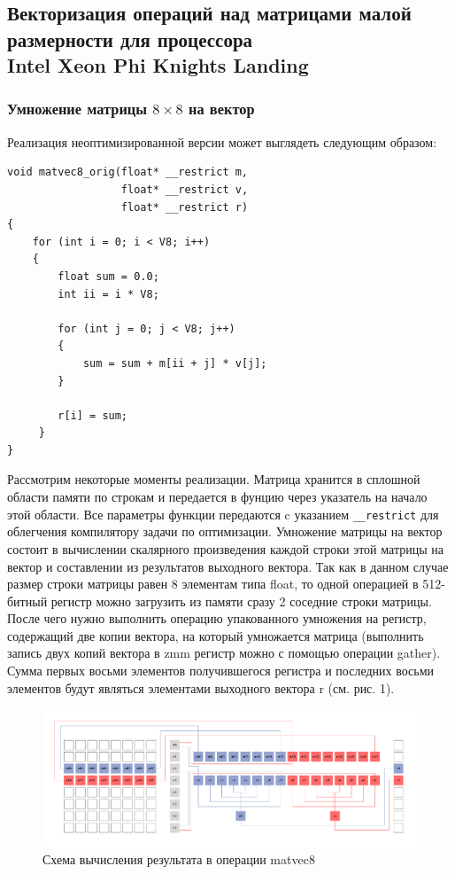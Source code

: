 \subsection{Векторизация операций над матрицами малой размерности для процессора \\ Intel Xeon Phi Knights Landing}

\subsubsection{Умножение матрицы $8 \times 8$ на вектор}

Реализация неоптимизированной версии может выглядеть следующим образом:

\begin{lstlisting}[caption={Невекторизованная версия умножения матрицы размера $8 \times 8$ на вектор},label={lst:text_4_small_matr_8x8_mul_vel_noopt}]
void matvec8_orig(float* __restrict m,
                  float* __restrict v,
                  float* __restrict r)
{
    for (int i = 0; i < V8; i++)
    {
        float sum = 0.0;
        int ii = i * V8;

        for (int j = 0; j < V8; j++)
        {
            sum = sum + m[ii + j] * v[j];
        }

        r[i] = sum;
     }
}
\end{lstlisting}

Рассмотрим некоторые моменты реализации.
Матрица хранится в сплошной области памяти по строкам и передается в фунцию через указатель на начало этой области.
Все параметры функции передаются c указанием \texttt{\_\_restrict} для облегчения компилятору задачи по оптимизации.
Умножение матрицы на вектор состоит в вычислении скалярного произведения каждой строки этой матрицы на вектор и составлении из результатов выходного вектора.
Так как в данном случае размер строки матрицы равен 8 элементам типа float, то одной операцией в 512-битный регистр можно загрузить из памяти сразу 2 соседние строки матрицы.
После чего нужно выполнить операцию упакованного умножения на регистр, содержащий две копии вектора, на который умножается матрица (выполнить запись двух копий вектора в zmm регистр можно с помощью операции gather).
Сумма первых восьми элементов получившегося регистра и последних восьми элементов будут являться элементами выходного вектора r (см. рис. 1).

\begin{figure}[ht]
	\centering
		\includegraphics[width=1.00\textwidth]{./pics/text_4_small_matr/matvec8.pdf}
	\caption{Схема вычисления результата в операции matvec8}
	\label{fig:text_4_small_matr_matvec8}
\end{figure}


